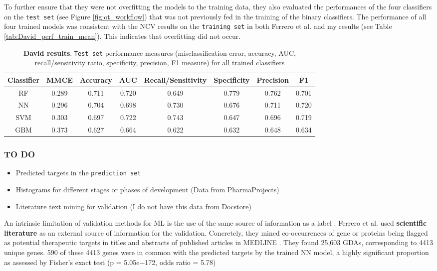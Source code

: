 To further ensure that they were not overfitting the models to the training data, they also evaluated the performances of the four classifiers on the \texttt{test set} (see Figure \ref{fig:ot_workflow}) that was not previously fed in the training of the binary classifiers. The performance of all four trained models was consistent with the NCV results on the \texttt{training set} in both Ferrero et al. \cite{ferrero2017} and my results (see Table \ref{tab:David_perf_train_mean}). This indicates that overfitting did not occur.

\begin{table}[H]
\centering
\begin{tabular}{c|c|c|c|c|c|c|c}
Classifier & MMCE  & Accuracy   & AUC   & Recall/Sensitivity   & Specificity   & Precision   & F1    \\
\hline
RF & 0.289 & 0.711 & 0.720 & 0.649 & 0.779 & 0.762 & 0.701 \\
NN & 0.296 & 0.704 & 0.698 & 0.730 & 0.676 & 0.711 & 0.720 \\
SVM & 0.303 & 0.697 & 0.722 & 0.743 & 0.647 & 0.696 & 0.719 \\
GBM & 0.373 & 0.627 & 0.664 & 0.622 & 0.632 & 0.648 & 0.634
\end{tabular}
\caption{\textbf{David results}. \texttt{Test set} performance measures (misclassification error, accuracy, AUC, recall/sensitivity ratio, specificity, precision, F1 measure) for all trained classifiers \label{tab:OT_perf_test}}
\end{table}

\subsubsection{TO DO}
\begin{itemize}
    \item Predicted targets in the \texttt{prediction set}
    \item Histograms for different stages or phases of development (Data from PharmaProjects)
    \item Literature text mining for validation (I do not have this data from Docstore)
\end{itemize}

An intrinsic limitation of validation methods for ML is the use of the same source of information as a label \cite{ferrero2017}. Ferrero et al. used \textbf{scientific literature} as an external source of information for the validation. Concretely, they mined co-occurrences of gene or proteins being flagged as potential therapeutic targets in titles and abstracts of published articles in MEDLINE \cite{ferrero2017}. They found 25,603 GDAs, corresponding to 4413 unique genes\cite{ferrero2017}. 590 of these 4413 genes were in common with the predicted targets by the trained NN model, a highly significant proportion as assessed by Fisher’s exact test (p = 5.05e−172, odds ratio = 5.78) \cite{ferrero2017}

